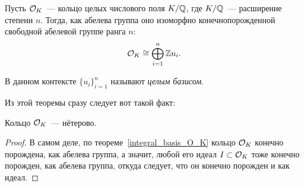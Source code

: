 	\begin{theorem}\label{integral_basis_O_K} 
		Пусть $\mathcal{O}_{K}$~--- кольцо целых числового поля $K/\mathbb{Q}$, где $K/\mathbb{Q}$~--- расширение степени $n$. Тогда, как абелева группа оно изоморфно конечнопорожденной свободной абелевой группе ранга $n$:
		\[
			\mathcal{O}_{K} \cong \bigoplus_{i = 1}^{n} \mathbb{Z} u_i.
		\]

		В данном контексте $\{ u_i \}_{i = 1}^{n}$ называют \emph{целым базисом}. 
	\end{theorem}

	Из этой теоремы сразу следует вот такой факт:

	\begin{theorem} 
		Кольцо $\mathcal{O}_{K}$~--- нётерово. 
	\end{theorem}
	\begin{proof}
		В самом деле, по теореме~\ref{integral_basis_O_K} кольцо $\mathcal{O}_{K}$ конечно порождена, как абелева группа, а значит, любой его идеал $I \subset \mathcal{O}_K$ тоже конечно порожден, как абелева группа, откуда следует, что он конечно порожден и как идеал. 
	\end{proof}

